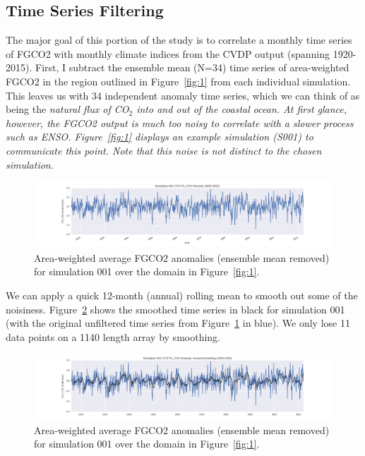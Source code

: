 \documentclass[12pt]{article}
\begin{document}
\subsection{Time Series Filtering}
The major goal of this portion of the study is to correlate a monthly time series of FGCO2 with monthly climate indices from the CVDP output (spanning 1920-2015). First, I subtract the ensemble mean (N=34) time series of area-weighted FGCO2 in the region outlined in Figure~\ref{fig:1} from each individual simulation. This leaves us with 34 independent anomaly time series, which we can think of as being the \it natural \rm flux of CO$_{2}$ into and out of the coastal ocean. At first glance, however, the FGCO2 output is much too noisy to correlate with a slower process such as ENSO. Figure~\ref{fig:1} displays an example simulation (S001) to communicate this point. Note that this noise is not distinct to the chosen simulation.
\begin{figure}[!h]
	\centering
	\includegraphics[width=\linewidth]{../../figs/calcs/timeseries/ccs-unfiltered-fgco2-series-example.png}
	\caption{Area-weighted average FGCO2 anomalies (ensemble mean removed) for simulation 001 over the domain in Figure~\ref{fig:1}.}
	\label{fig:2}
\end{figure}

We can apply a quick 12-month (annual) rolling mean to smooth out some of the noisiness. Figure~\ref{fig:3} shows the smoothed time series in black for simulation 001 (with the original unfiltered time series from Figure~\ref{fig:2} in blue). We only lose 11 data points on a 1140 length array by smoothing. 
\begin{figure}[!h]
	\centering
	\includegraphics[width=\linewidth]{../../figs/calcs/timeseries/ccs-filtered-fgco2-series-example.png}
	\caption{Area-weighted average FGCO2 anomalies (ensemble mean removed) for simulation 001 over the domain in Figure~\ref{fig:1}.}
	\label{fig:3}
\end{figure}
\end{document}
